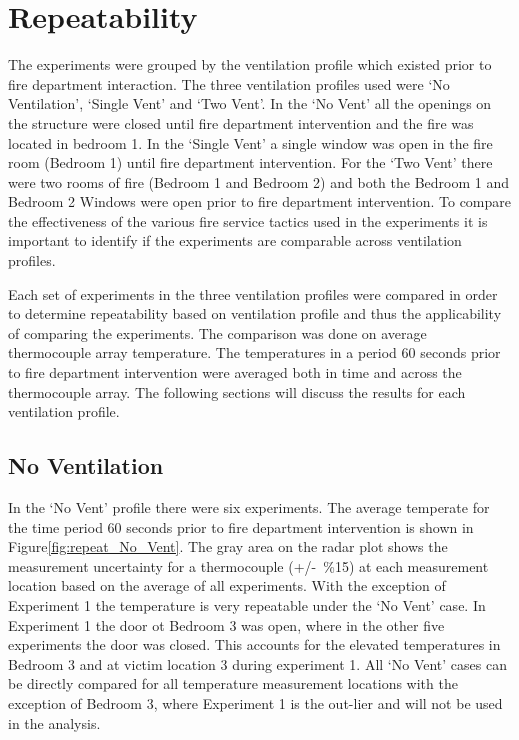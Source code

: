 \documentclass[12pt,oneside]{book}
\begin{document}
\section{Repeatability}
The experiments were grouped by the ventilation profile which existed prior to fire department interaction. The three ventilation profiles used were `No Ventilation', `Single Vent' and `Two Vent'. In the `No Vent' all the openings on the structure were closed until fire department intervention and the fire was located in bedroom 1. In the `Single Vent' a single window was open in the fire room (Bedroom 1) until fire department intervention. For the `Two Vent' there were two rooms of fire (Bedroom 1 and Bedroom 2) and both the Bedroom 1 and Bedroom 2 Windows were open prior to fire department intervention. To compare the effectiveness of the various fire service tactics used in the experiments it is important to identify if the experiments are comparable across ventilation profiles. 

Each set of experiments in the three ventilation profiles were compared in order to determine repeatability based on ventilation profile and thus the applicability of comparing the experiments. The comparison was done on average thermocouple array temperature. The temperatures in a period 60 seconds prior to fire department intervention were averaged both in time and across the thermocouple array. The following sections will discuss the results for each ventilation profile. 

\subsection{No Ventilation}
In the `No Vent' profile there were six experiments. The average temperate for the time period 60 seconds prior to fire department intervention is shown in Figure\ref{fig:repeat_No_Vent}. The gray area on the radar plot shows the measurement uncertainty for a thermocouple (+/-~\%15) at each measurement location based on the average of all experiments. With the exception of Experiment 1 the temperature is very repeatable under the `No Vent' case. In Experiment 1 the door ot Bedroom 3 was open, where in the other five experiments the door was closed. This accounts for the elevated temperatures in Bedroom 3 and at victim location 3 during experiment 1. All `No Vent' cases can be directly compared for all temperature measurement locations with the exception of Bedroom 3, where Experiment 1 is the out-lier and will not be used in the analysis. 
\end{document}

